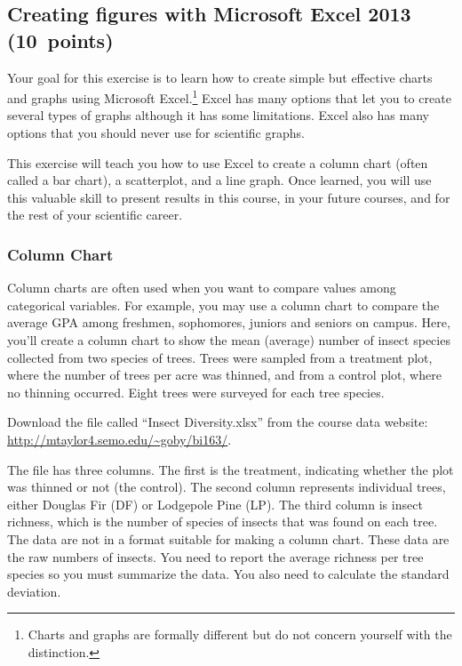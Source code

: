 \documentclass[12pt, hidelinks]{exam}
\newcommand{\hidepoints}{%
	\pointsinmargin\pointformat{}
}
\newcommand{\VSpace}{\vspace{\baselineskip}}
\begin{document}
\hidepoints

\subsection*{Creating figures with Microsoft Excel 2013 (10~points)}

Your goal for this exercise is to learn how to create simple but effective charts and graphs using Microsoft Excel.\footnote{Charts and graphs are formally different but do not concern yourself with the distinction.}  Excel has many options that let you to create several types of graphs although it has some limitations. Excel also has many options that you should never use for scientific graphs. 

This exercise will teach you how to use Excel to create a column chart (often called a bar chart), a scatterplot, and a line graph. Once learned, you will use this valuable skill to present results in this course, in your future courses, and for the rest of your scientific career. 

\subsubsection*{Column Chart}

Column charts are often used when you want to compare values among categorical variables. For example, you may use a column chart to compare the average GPA among freshmen, sophomores, juniors and seniors on campus. Here, you’ll create a column chart to show the mean (average) number of insect species collected from two species of trees. Trees were sampled from a treatment plot, where the number of trees per acre was thinned, and from a control plot, where no thinning occurred. Eight trees were surveyed for each tree species.\VSpace

Download the file called “Insect Diversity.xlsx” from the course data website: \url{http://mtaylor4.semo.edu/~goby/bi163/}.\VSpace

The file has three columns. The first is the treatment, indicating whether the plot was thinned or not (the control). The second column represents individual trees, either Douglas Fir (DF) or Lodgepole Pine (LP). The third column is insect richness, which is the number of species of insects that was found on each tree. The data are not in a format suitable for making a column chart. These data are the raw numbers of insects. You need to report the average richness per tree species so you must summarize the data. You also need to calculate the standard deviation.
\end{document}

